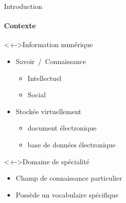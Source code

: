 \begin{frame}{Introduction}\framesubtitle{Contexte}

  \begin{block}<+->{Information numérique}
    \begin{itemize}
      \item{Savoir~/~Connaissance}
      \begin{itemize}
        \item{Intellectuel}
        \item{Social}
      \end{itemize}
      \item{Stockée virtuellement}
      \begin{itemize}
        \item{document électronique}
        \item{base de données électronique}
      \end{itemize}
    \end{itemize}
  \end{block}

  \begin{block}<+->{Domaine de spécialité}
    \begin{itemize}
      \item{Champ de connaissance particulier}
      \item{Possède un vocabulaire spécifique}
    \end{itemize}
  \end{block}
\end{frame}

